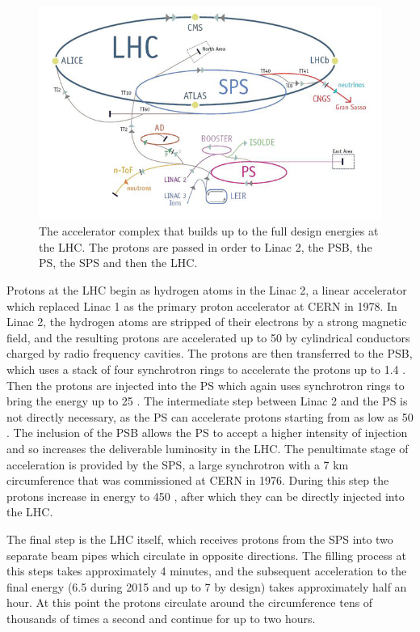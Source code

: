 \begin{figure}[h]
\centering
\includegraphics[width=\fullfig]{figures/accelerator_complex.jpg}
\caption{The accelerator complex that builds up to the full design energies at the \ac{LHC}. The protons are passed in order to Linac 2, the \acs{PSB}, the \acs{PS}, the \acs{SPS} and then the \ac{LHC}.}
\label{fig:accelerator_complex}
\end{figure}

Protons at the \ac{LHC} begin as hydrogen atoms in the Linac 2, a linear accelerator which replaced Linac 1 as the primary proton accelerator at CERN in 1978.
In Linac 2, the hydrogen atoms are stripped of their electrons by a strong magnetic field, and the resulting protons are accelerated up to 50 \MeV by cylindrical conductors charged by radio frequency cavities.
The protons are then transferred to the \ac{PSB}, which uses a stack of four synchrotron rings to accelerate the protons up to 1.4 \GeV.
Then the protons are injected into the \ac{PS} which again uses synchrotron rings to bring the energy up to 25 \GeV.
The intermediate step between Linac 2 and the \ac{PS} is not directly necessary, as the \ac{PS} can accelerate protons starting from as low as 50 \MeV.
The inclusion of the \ac{PSB} allows the \ac{PS} to accept a higher intensity of injection and so increases the deliverable luminosity in the \ac{LHC}.
The penultimate stage of acceleration is provided by the \ac{SPS}, a large synchrotron with a 7 km circumference that was commissioned at CERN in 1976.
During this step the protons increase in energy to 450 \GeV, after which they can be directly injected into the \ac{LHC}. 


The final step is the \ac{LHC} itself, which receives protons from the \ac{SPS} into two separate beam pipes which circulate in opposite directions.
The filling process at this steps takes approximately 4 minutes, and the subsequent acceleration to the final energy (6.5 \TeV during 2015 and up to 7 \TeV by design) takes approximately half an hour.
At this point the protons circulate around the circumference tens of thousands of times a second and continue for up to two hours.


